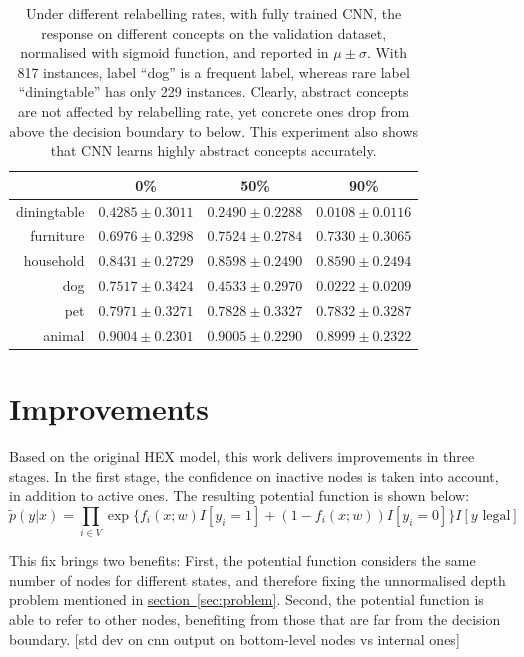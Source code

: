 \documentclass[11pt,a4paper]{article}
\begin{document}
\begin{table}[htbp]
\centering
\begin{tabular}{r|c|c|c}
 & 0\% & 50\% & 90\%\\
\hline
diningtable & $0.4285\pm0.3011$ & $0.2490\pm0.2288$ & $0.0108\pm0.0116$\\
furniture & $0.6976\pm0.3298$ & $0.7524\pm0.2784$ & $0.7330\pm0.3065$\\
household & $0.8431\pm0.2729$ & $0.8598\pm0.2490$ & $0.8590\pm0.2494$\\
\hline
dog & $0.7517\pm0.3424$ & $0.4533\pm0.2970$ & $0.0222\pm0.0209$\\
pet & $0.7971\pm0.3271$ & $0.7828\pm0.3327$ & $0.7832\pm0.3287$\\
animal & $0.9004\pm0.2301$ & $0.9005\pm0.2290$ & $0.8999\pm0.2322$
\end{tabular}
\caption{Under different relabelling rates, with fully trained CNN, the response on different concepts on the validation dataset, normalised with sigmoid function, and reported in $\mu\pm\sigma$. With 817 instances, label ``dog'' is a frequent label, whereas rare label ``diningtable'' has only 229 instances. Clearly, abstract concepts are not affected by relabelling rate, yet concrete ones drop from above the decision boundary to below. This experiment also shows that CNN learns highly abstract concepts accurately.}
\end{table}

\clearpage
\section{Improvements}


Based on the original HEX model, this work delivers improvements in three stages. In the first stage, the confidence on inactive nodes is taken into account, in addition to active ones. The resulting potential function is shown below:
\begin{equation}
\tilde{p}(y|x)=\prod_{i\in V}\exp\{f_i(x;w)I[y_i=1]+(1-f_i(x;w))I[y_i=0]\}I[y\text{ legal}]
\label{eqn:pn}
\end{equation}

This fix brings two benefits: First, the potential function considers the same number of nodes for different states, and therefore fixing the unnormalised depth problem mentioned in \hyperref[sec:problem]{section~\ref{sec:problem}}. Second, the potential function is able to refer to other nodes, benefiting from those that are far from the decision boundary. [std dev on cnn output on bottom-level nodes vs internal ones]
\end{document}
